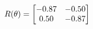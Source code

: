 \documentclass[preview]{standalone}
\begin{document}
\begin{align*}
\special{dvisvgm:raw <g id='unique000'>}R(\theta) = \begin{bmatrix}-0.87 & -0.50\\0.50 & -0.87\end{bmatrix}\special{dvisvgm:raw </g>}
\end{align*}
\end{document}
